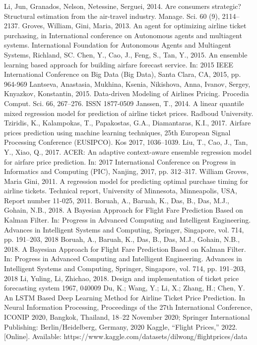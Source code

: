 \documentclass[conference]{IEEEtran}
\begin{document}
\begin{thebibliography}{00}
 Li, Jun, Granados, Nelson, Netessine, Serguei, 2014. Are consumers strategic? Structural estimation from the air-travel industry. Manage. Sci. 60 (9), 2114– 2137.
 Groves, William, Gini, Maria, 2013. An agent for optimizing airline ticket purchasing, in International conference on Autonomous agents and multiagent systems. International Foundation for Autonomous Agents and Multiagent Systems, Richland, SC.
 Chen, Y., Cao, J., Feng, S., Tan, Y., 2015. An ensemble learning based approach for building airfare forecast service. In: 2015 IEEE International Conference on Big Data (Big Data), Santa Clara, CA, 2015, pp. 964-969
 Lantseva, Anastasia, Mukhina, Ksenia, Nikishova, Anna, Ivanov, Sergey, Knyazkov, Konstantin, 2015. Data-driven Modeling of Airlines Pricing. Procedia Comput. Sci. 66, 267–276. ISSN 1877-0509
 Janssen, T., 2014. A linear quantile mixed regression model for prediction of airline ticket prices. Radboud University. 
 Tziridis, K., Kalampokas, T., Papakostas, G.A., Diamantaras, K.I., 2017. Airfare prices prediction using machine learning techniques, 25th European Signal Processing Conference (EUSIPCO). Kos 2017, 1036–1039.
 Liu, T., Cao, J., Tan, Y., Xiao, Q., 2017. ACER: An adaptive context-aware ensemble regression model for airfare price prediction. In: 2017 International Conference on Progress in Informatics and Computing (PIC), Nanjing, 2017, pp. 312–317.
 William Groves, Maria Gini, 2011. A regression model for predicting optimal purchase timing for airline tickets. Technical report, University of Minnesota, Minneapolis, USA, Report number 11-025, 2011.
 Boruah, A., Baruah, K., Das, B., Das, M.J., Gohain, N.B., 2018. A Bayesian Approach for Flight Fare Prediction Based on Kalman Filter. In: Progress in Advanced Computing and Intelligent Engineering. Advances in Intelligent Systems and Computing, Springer, Singapore, vol. 714, pp. 191–203, 2018 Boruah, A., Baruah, K., Das, B., Das, M.J., Gohain, N.B., 2018. A Bayesian Approach for Flight Fare Prediction Based on Kalman Filter. In: Progress in Advanced Computing and Intelligent Engineering. Advances in Intelligent Systems and Computing, Springer, Singapore, vol. 714, pp. 191–203, 2018
 Li, Yuling, Li, Zhichao, 2018. Design and implementation of ticket price forecasting system 1967, 040009
 Du, K.; Wang, Y.; Li, X.; Zhang, H.; Chen, Y. An LSTM Based Deep Learning Method for Airline Ticket Price Prediction. In Neural Information Processing, Proceedings of the 27th International Conference, ICONIP 2020, Bangkok, Thailand, 18–22 November 2020; Springer International Publishing: Berlin/Heidelberg, Germany, 2020
 Kaggle, “Flight Prices,” 2022. [Online]. Available: https://www.kaggle.com/datasets/dilwong/flightprices/data
\end{thebibliography}
\end{document}
